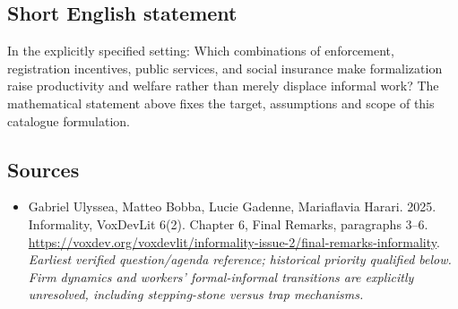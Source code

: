 \documentclass[11pt]{article}
\begin{document}
\subsection{Short English statement}
In the explicitly specified setting: Which combinations of enforcement, registration incentives, public services, and social insurance make formalization raise productivity and welfare rather than merely displace informal work? The mathematical statement above fixes the target, assumptions and scope of this catalogue formulation.

\subsection{Sources}
\begin{itemize}\raggedright
\item[\textnormal{[S1]}]\hypertarget{source:30007658:1}{} Gabriel Ulyssea, Matteo Bobba, Lucie Gadenne, Mariaflavia Harari. 2025. Informality, VoxDevLit 6(2). Chapter 6, Final Remarks, paragraphs 3–6.
\url{https://voxdev.org/voxdevlit/informality-issue-2/final-remarks-informality}.
{\small\textit{Earliest verified question/agenda reference; historical priority qualified below. Firm dynamics and workers’ formal-informal transitions are explicitly unresolved, including stepping-stone versus trap mechanisms.}}
\end{itemize}
\end{document}
